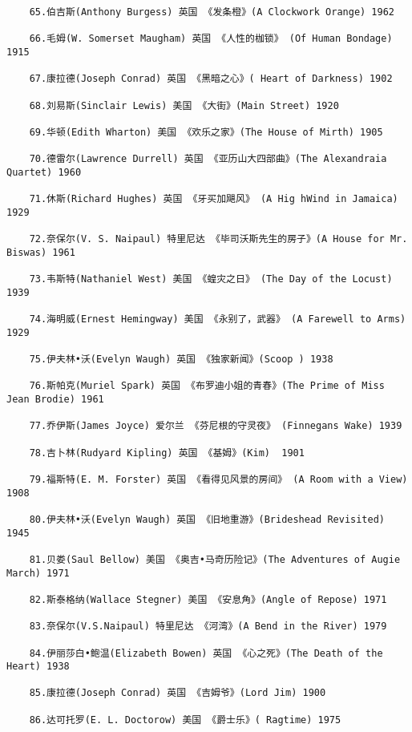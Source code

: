 \documentclass[UTF8]{../RepresentationUniverse}
\begin{document}
\begin{lstlisting}
    65.伯吉斯(Anthony Burgess) 英国 《发条橙》(A Clockwork Orange) 1962
    
    66.毛姆(W. Somerset Maugham) 英国 《人性的枷锁》 (Of Human Bondage) 1915
    
    67.康拉德(Joseph Conrad) 英国 《黑暗之心》( Heart of Darkness) 1902
    
    68.刘易斯(Sinclair Lewis) 美国 《大街》(Main Street) 1920
    
    69.华顿(Edith Wharton) 美国 《欢乐之家》(The House of Mirth) 1905
    
    70.德雷尔(Lawrence Durrell) 英国 《亚历山大四部曲》(The Alexandraia Quartet) 1960
    
    71.休斯(Richard Hughes) 英国 《牙买加飓风》 (A Hig hWind in Jamaica) 1929
    
    72.奈保尔(V. S. Naipaul) 特里尼达 《毕司沃斯先生的房子》(A House for Mr. Biswas) 1961
    
    73.韦斯特(Nathaniel West) 美国 《蝗灾之日》 (The Day of the Locust) 1939
    
    74.海明威(Ernest Hemingway) 美国 《永别了，武器》 (A Farewell to Arms) 1929
    
    75.伊夫林•沃(Evelyn Waugh) 英国 《独家新闻》(Scoop ) 1938
    
    76.斯帕克(Muriel Spark) 英国 《布罗迪小姐的青春》(The Prime of Miss Jean Brodie) 1961
    
    77.乔伊斯(James Joyce) 爱尔兰 《芬尼根的守灵夜》 (Finnegans Wake) 1939
    
    78.吉卜林(Rudyard Kipling) 英国 《基姆》(Kim)  1901
    
    79.福斯特(E. M. Forster) 英国 《看得见风景的房间》 (A Room with a View) 1908
    
    80.伊夫林•沃(Evelyn Waugh) 英国 《旧地重游》(Brideshead Revisited) 1945
    
    81.贝娄(Saul Bellow) 美国 《奥吉•马奇历险记》(The Adventures of Augie March) 1971
    
    82.斯泰格纳(Wallace Stegner) 美国 《安息角》(Angle of Repose) 1971
    
    83.奈保尔(V.S.Naipaul) 特里尼达 《河湾》(A Bend in the River) 1979
    
    84.伊丽莎白•鲍温(Elizabeth Bowen) 英国 《心之死》(The Death of the Heart) 1938
    
    85.康拉德(Joseph Conrad) 英国 《吉姆爷》(Lord Jim) 1900
    
    86.达可托罗(E. L. Doctorow) 美国 《爵士乐》( Ragtime) 1975
    

\end{lstlisting}
\end{document}
